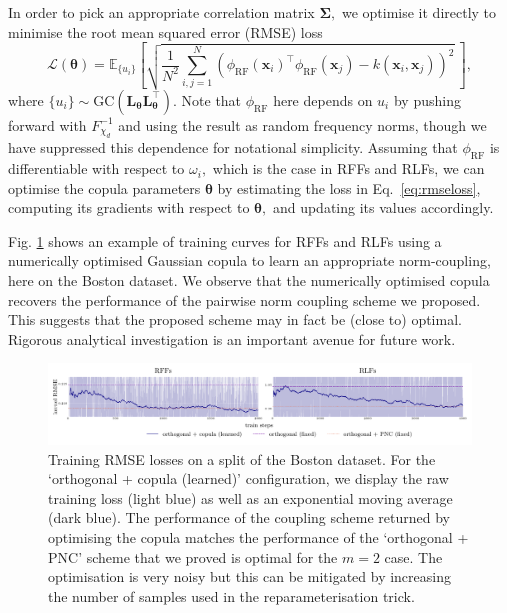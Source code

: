 In order to pick an appropriate correlation matrix $\boldsymbol{\Sigma},$ we optimise it directly to minimise the root mean squared error (RMSE) loss
\begin{equation}
    \label{eq:rmseloss}
    \mathcal{L}(\boldsymbol{\theta}) = \mathbb{E}_{\{u_i\}}\left[\sqrt{\frac{1}{N^2}\sum_{i, j=1}^N (\phi_{\text{RF}}(\boldsymbol{x}_i)^\top\phi_{\text{RF}}(\boldsymbol{x}_j) - k(\boldsymbol{x}_i, \boldsymbol{x}_j))^2}~\right],
\end{equation}
where $\{u_i\} \sim \text{GC}(\mathbf{L}_{\boldsymbol{\theta}}\mathbf{L}_{\boldsymbol{\theta}}^\top).$
Note that $\phi_{\text{RF}}$ here depends on $u_i$ by pushing forward with $F_{\chi_d}^{-1}$ and using the result as random frequency norms, though we have suppressed this dependence for notational simplicity.
Assuming that $\phi_{\text{RF}}$ is differentiable with respect to $\omega_i,$ which is the case in RFFs and RLFs, we can optimise the copula parameters $\boldsymbol{\theta}$ by estimating the loss in Eq.~\ref{eq:rmseloss}, computing its gradients with respect to $\boldsymbol{\theta},$ and updating its values accordingly.

 Fig.
\ref{fig:boston-losses} shows an example of training curves for RFFs and RLFs using a numerically optimised Gaussian copula to learn an appropriate norm-coupling, here on the Boston dataset.
We observe that the numerically optimised copula recovers the performance of the pairwise norm coupling scheme we proposed.
This suggests that the proposed scheme may in fact be (close to) optimal.
Rigorous analytical investigation is an important avenue for future work.

\begin{figure}
    \centering
    \includegraphics[width=\linewidth]{images/copula_training_curves.pdf}
    \caption{
        Training RMSE losses on a split of the Boston dataset.
        For the `orthogonal + copula (learned)' configuration, we display the raw training loss (light blue) as well as an exponential moving average (dark blue).
        The performance of the coupling scheme returned by optimising the copula matches the performance of the `orthogonal + PNC' scheme that we proved is optimal for the $m = 2$ case.
        The optimisation is very noisy but this can be mitigated by increasing the number of samples used in the reparameterisation trick.
    }
    \label{fig:boston-losses}
\end{figure}

